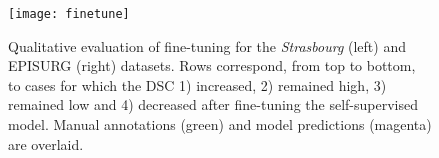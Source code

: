 \begin{figure}[ht!]
  \centering
  \texttt{[image: finetune]}
  \caption[Qualitative evaluation of fine-tuning]{
    Qualitative evaluation of fine-tuning for the \textit{Strasbourg} (left) and EPISURG (right) datasets.
    Rows correspond, from top to bottom, to cases for which the \acf{DSC}
    1) increased,
    2) remained high,
    3) remained low and
    4) decreased
    after fine-tuning the self-supervised model.
    Manual annotations (green) and model predictions (magenta) are overlaid.
  }
  \label{fig:finetuning_qual}
\end{figure}
